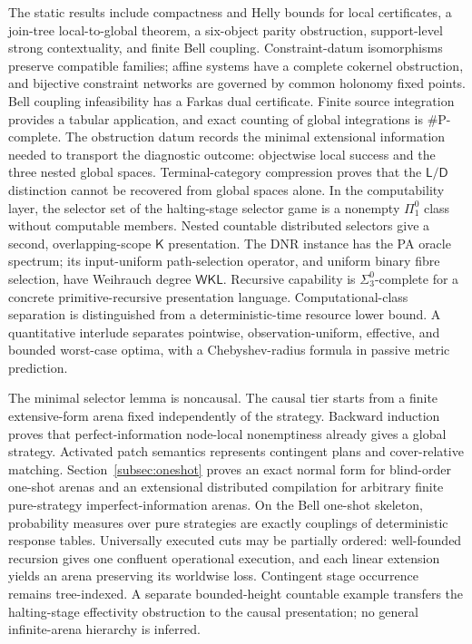 \documentclass[11pt]{article}
\theoremstyle{plain}
\theoremstyle{definition}
\theoremstyle{remark}
\begin{document}
The static results include compactness and Helly bounds for local certificates,
a join-tree local-to-global theorem, a six-object parity obstruction,
support-level strong contextuality, and finite Bell coupling. Constraint-datum
isomorphisms preserve compatible families; affine systems have a complete
cokernel obstruction, and bijective constraint networks are governed by common
holonomy fixed points. Bell coupling infeasibility has a Farkas dual certificate. Finite source
integration provides a tabular application, and exact counting of global
integrations is $\#\mathrm P$-complete. The obstruction datum records the minimal
extensional information needed to transport the diagnostic outcome: objectwise
local success and the three nested global spaces. Terminal-category compression proves that the $\mathsf L/\mathsf D$
distinction cannot be recovered from global spaces alone. In the computability layer, the selector
set of the halting-stage selector game is a nonempty $\Pi^0_1$ class without
computable members. Nested countable distributed selectors give a second,
overlapping-scope $\mathsf K$ presentation. The DNR instance has the PA oracle
spectrum; its input-uniform path-selection operator, and uniform binary fibre
selection, have Weihrauch degree $\mathsf{WKL}$. Recursive capability is
$\Sigma^0_3$-complete for a concrete primitive-recursive presentation language.
Computational-class separation is distinguished from a deterministic-time
resource lower bound. A quantitative interlude separates pointwise,
observation-uniform, effective, and bounded worst-case optima, with a
Chebyshev-radius formula in passive metric prediction.

The minimal selector lemma is noncausal. The causal tier starts
from a finite extensive-form arena fixed independently of the strategy. Backward
induction proves that perfect-information node-local nonemptiness already gives
a global strategy. Activated patch semantics represents contingent plans and
cover-relative matching. Section~\ref{subsec:oneshot} proves an exact normal
form for blind-order one-shot arenas and an extensional distributed compilation
for arbitrary finite pure-strategy imperfect-information arenas. On the Bell
one-shot skeleton, probability measures over pure strategies are exactly
couplings of deterministic response tables. Universally executed cuts may be
partially ordered: well-founded recursion gives one confluent operational
execution, and each linear extension yields an arena preserving its worldwise
loss. Contingent stage occurrence remains tree-indexed. A separate bounded-height
countable example transfers the halting-stage effectivity obstruction to the
causal presentation; no general infinite-arena hierarchy is inferred.
\end{document}
